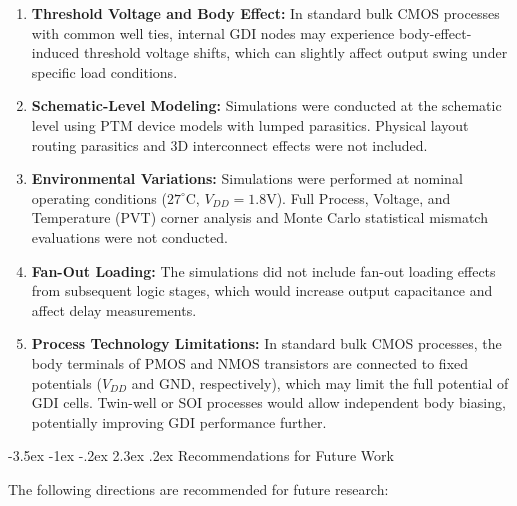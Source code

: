 \documentclass[12pt,a4paper,oneside]{report}
\makeatletter
\renewcommand\section{\@startsection {section}{1}{\z@}%
                                   {-3.5ex \@plus -1ex \@minus -.2ex}%
                                   {2.3ex \@plus.2ex}%
                                   {\normalfont\normalsize\bfseries}}
\makeatother
\begin{document}
\begin{enumerate}
\item \textbf{Threshold Voltage and Body Effect:} In standard bulk CMOS processes with common well ties, internal GDI nodes may experience body-effect-induced threshold voltage shifts, which can slightly affect output swing under specific load conditions.
\item \textbf{Schematic-Level Modeling:} Simulations were conducted at the schematic level using PTM device models with lumped parasitics. Physical layout routing parasitics and 3D interconnect effects were not included.
\item \textbf{Environmental Variations:} Simulations were performed at nominal operating conditions ($27^\circ\text{C}$, $V_{DD}=1.8\text{V}$). Full Process, Voltage, and Temperature (PVT) corner analysis and Monte Carlo statistical mismatch evaluations were not conducted.
\item \textbf{Fan-Out Loading:} The simulations did not include fan-out loading effects from subsequent logic stages, which would increase output capacitance and affect delay measurements.
\item \textbf{Process Technology Limitations:} In standard bulk CMOS processes, the body terminals of PMOS and NMOS transistors are connected to fixed potentials ($V_{DD}$ and GND, respectively), which may limit the full potential of GDI cells. Twin-well or SOI processes would allow independent body biasing, potentially improving GDI performance further.
\end{enumerate}

\section{Recommendations for Future Work}

The following directions are recommended for future research:
\end{document}
